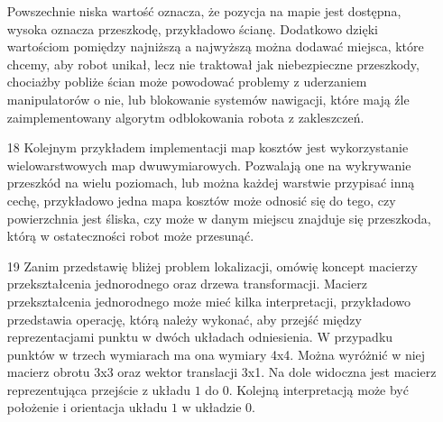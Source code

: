 \documentclass[20pt,a4paper]{article}
\begin{document}
\begin{itemize}
Powszechnie niska wartość oznacza, że pozycja na mapie jest dostępna, wysoka oznacza przeszkodę, przykładowo ścianę. 
Dodatkowo dzięki wartościom pomiędzy najniższą a najwyższą można dodawać miejsca, które chcemy, aby robot unikał, lecz nie traktował jak niebezpieczne przeszkody, chociażby pobliże ścian może powodować problemy z uderzaniem manipulatorów o nie, lub blokowanie systemów nawigacji, które mają źle zaimplementowany algorytm odblokowania robota z zakleszczeń.
		\item[18]
		Kolejnym przykładem implementacji map kosztów jest wykorzystanie wielowarstwowych map dwuwymiarowych.
    Pozwalają one na wykrywanie przeszkód na wielu poziomach, lub można każdej warstwie przypisać inną cechę, przykładowo jedna mapa kosztów może odnosić się do tego, czy powierzchnia jest śliska, czy może w danym miejscu znajduje się przeszkoda, którą w ostateczności robot może przesunąć. 
    \item[19]
    Zanim przedstawię bliżej problem lokalizacji, omówię koncept macierzy przekształcenia jednorodnego oraz drzewa transformacji.
Macierz przekształcenia jednorodnego może mieć kilka interpretacji, przykładowo przedstawia operację, którą należy wykonać, aby przejść między reprezentacjami punktu w dwóch układach odniesienia.
W przypadku punktów w trzech wymiarach ma ona wymiary 4x4. Można wyróżnić w niej macierz obrotu 3x3 oraz wektor translacji 3x1.
		Na dole widoczna jest macierz reprezentująca przejście z układu $1$ do $0$. 
		Kolejną interpretacją może być położenie i orientacja układu $1$ w układzie $0$.


\end{itemize}
\end{document}
